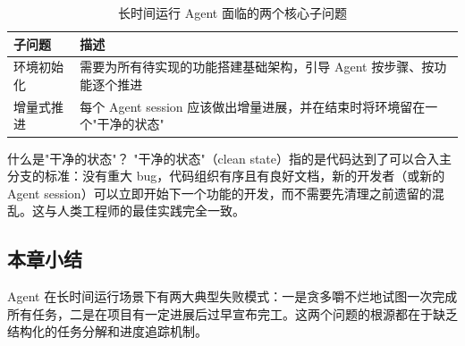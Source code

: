 \begin{table}[H]
\centering
\begin{tabular}{p{4cm}p{9cm}}
\toprule
\textbf{子问题} & \textbf{描述} \\
\midrule
环境初始化 & 需要为所有待实现的功能搭建基础架构，引导 Agent 按步骤、按功能逐个推进 \\
\midrule
增量式推进 & 每个 Agent session 应该做出增量进展，并在结束时将环境留在一个"干净的状态" \\
\bottomrule
\end{tabular}
\caption{长时间运行 Agent 面临的两个核心子问题}
\end{table}

\begin{importantbox}{什么是"干净的状态"？}
"干净的状态"（clean state）指的是代码达到了可以合入主分支的标准：没有重大 bug，代码组织有序且有良好文档，新的开发者（或新的 Agent session）可以立即开始下一个功能的开发，而不需要先清理之前遗留的混乱。这与人类工程师的最佳实践完全一致。
\end{importantbox}

\subsection{本章小结}

Agent 在长时间运行场景下有两大典型失败模式：一是贪多嚼不烂地试图一次完成所有任务，二是在项目有一定进展后过早宣布完工。这两个问题的根源都在于缺乏结构化的任务分解和进度追踪机制。


